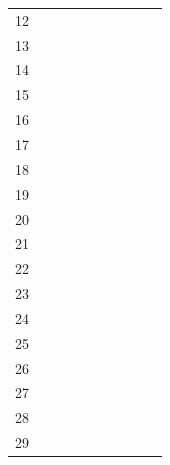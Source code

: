 \begin{table}
{\begin{tabular}{c | c | c | c | c | c | c | c | c | c}
			12 &   &   &   &   & \cellcolor{black} &   & \cellcolor{black} & \cellcolor{black} &   \\
			13 & \cellcolor{black} & \cellcolor{black} & \cellcolor{black} & \cellcolor{black} & \cellcolor{black} & \cellcolor{black} & \cellcolor{black} & \cellcolor{black} & \cellcolor{black} \\
			14 &   &   &   &   & \cellcolor{black} &   & \cellcolor{black} &   &   \\
			15 &   &   &   &   &   &   &   &   & \\
			16 &   & \cellcolor{black} & \cellcolor{black} & \cellcolor{black} & \cellcolor{black} &   & \cellcolor{black} &   & \cellcolor{black} \\
			17 &   &   &   &   &   &   &   &   & \\
			18 &   &   &   &   &   &   &   &   & \\
			19 & \cellcolor{black} & \cellcolor{black} & \cellcolor{black} & \cellcolor{black} & \cellcolor{black} & \cellcolor{black} & \cellcolor{black} & \cellcolor{black} & \cellcolor{black}\\
			20 &   &   & \cellcolor{black} & \cellcolor{black} & \cellcolor{black} & \cellcolor{black} & \cellcolor{black} & \cellcolor{black} & \cellcolor{black} \\
			21 &   &   &   &   & \cellcolor{black} &   & \cellcolor{black} &   & \\
			22 & \cellcolor{black} & \cellcolor{black} & \cellcolor{black} &   & \cellcolor{black} & \cellcolor{black} & \cellcolor{black} & \cellcolor{black} & \cellcolor{black} \\
			23 &   &   & \cellcolor{black} & \cellcolor{black} & \cellcolor{black} &   & \cellcolor{black} & \cellcolor{black} &  \\
			24 &   &   &   &   &   &   &   &   & \\
			25 &   &   & \cellcolor{black} & \cellcolor{black} & \cellcolor{black} &   & \cellcolor{black} &   & \cellcolor{black} \\
			26 &   &   &   &   &   &   &   &   & \\
			27 &   &   &   &   &   &   &   &   & \\
			28 & \cellcolor{black} & \cellcolor{black} & \cellcolor{black} & \cellcolor{black} & \cellcolor{black} & \cellcolor{black} & \cellcolor{black} & \cellcolor{black} & \cellcolor{black} \\
			29 &   & \cellcolor{black} & \cellcolor{black} & \cellcolor{black} & \cellcolor{black} & \cellcolor{black} & \cellcolor{black} & \cellcolor{black} & \cellcolor{black} \\

\end{tabular}}
\end{table}
